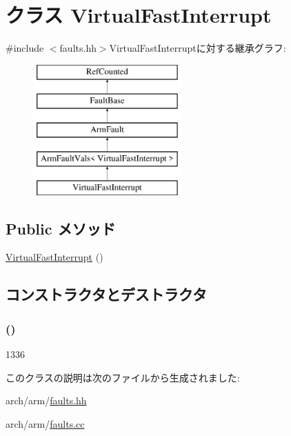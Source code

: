 \hypertarget{classArmISA_1_1VirtualFastInterrupt}{
\section{クラス VirtualFastInterrupt}
\label{classArmISA_1_1VirtualFastInterrupt}
}


{\ttfamily \#include $<$faults.hh$>$}VirtualFastInterruptに対する継承グラフ:\begin{figure}[H]
\begin{center}
\leavevmode
\includegraphics[height=5cm]{classArmISA_1_1VirtualFastInterrupt}
\end{center}
\end{figure}
\subsection*{Public メソッド}
\begin{DoxyCompactItemize}
\item 
\hyperlink{classArmISA_1_1VirtualFastInterrupt_adbc393b4cc90fcc9689f8767b3e7ffda}{VirtualFastInterrupt} ()
\end{DoxyCompactItemize}


\subsection{コンストラクタとデストラクタ}
\hypertarget{classArmISA_1_1VirtualFastInterrupt_adbc393b4cc90fcc9689f8767b3e7ffda}{
\subsubsection[{VirtualFastInterrupt}]{ ()}}
\label{classArmISA_1_1VirtualFastInterrupt_adbc393b4cc90fcc9689f8767b3e7ffda}



\begin{DoxyCode}
1336 {}
\end{DoxyCode}


このクラスの説明は次のファイルから生成されました:\begin{DoxyCompactItemize}
\item 
arch/arm/\hyperlink{arch_2arm_2faults_8hh}{faults.hh}\item 
arch/arm/\hyperlink{arch_2arm_2faults_8cc}{faults.cc}\end{DoxyCompactItemize}
